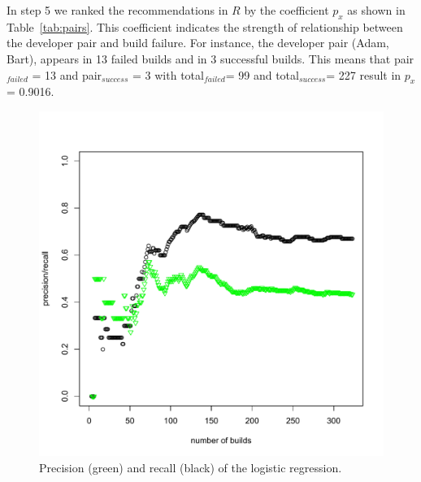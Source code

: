 
In step 5 we ranked the recommendations in $R$
by the coefficient $p_{x}$ as shown in Table~\ref{tab:pairs}. This coefficient indicates the strength of
relationship between the developer pair and build failure. For instance, the
developer pair (Adam, Bart), appears in 13 failed builds and in 3
successful builds. This means that pair$_{failed}$ = 13 and pair$_{success}$ = 3
with total$_{failed}$= 99 and total$_{success}$= 227 result in $p_x$= 0.9016.


\begin{figure}[t]
\vspace{-29pt}
\centering
\includegraphics[width=\columnwidth]{precision-recall-logreg}
\vspace{-25pt}
\caption{Precision (green) and recall (black) of the logistic regression.}
\label{fig:prediction}
\vspace{-10pt}
\end{figure}

